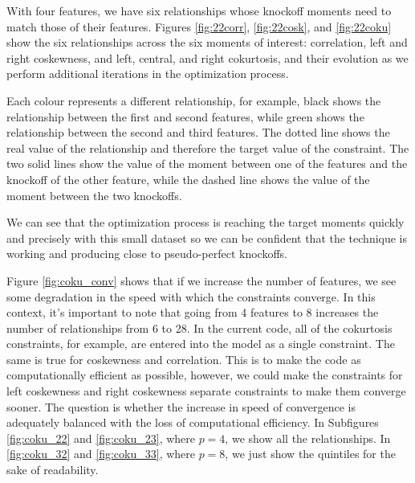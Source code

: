 \documentclass[review]{elsarticle}
\begin{document}
With four features, we have six relationships whose knockoff moments need to match those of their features. Figures \ref{fig:22corr}, \ref{fig:22cosk}, and \ref{fig:22coku} show the six relationships across the six moments of interest: correlation, left and right coskewness, and left, central, and right cokurtosis, and their evolution as we perform additional iterations in the optimization process. 

Each colour represents a different relationship, for example, black shows the relationship between the first and second features, while green shows the relationship between the second and third features. The dotted line shows the real value of the relationship and therefore the target value of the constraint. The two solid lines show the value of the moment between one of the features and the knockoff of the other feature, while the dashed line shows the value of the moment between the two knockoffs.

We can see that the optimization process is reaching the target moments quickly and precisely with this small dataset so we can be confident that the technique is working and producing close to pseudo-perfect knockoffs.

Figure \ref{fig:coku_conv} shows that if we increase the number of features, we see some degradation in the speed with which the constraints converge. In this context, it's important to note that going from 4 features to 8 increases the number of relationships from 6 to 28. In the current code, all of the cokurtosis constraints, for example, are entered into the model as a single constraint. The same is true for coskewness and correlation. This is to make the code as computationally efficient as possible, however, we could make the constraints for left coskewness and right coskewness separate constraints to make them converge sooner. The question is whether the increase in speed of convergence is adequately balanced with the loss of computational efficiency. In Subfigures \ref{fig:coku_22} and \ref{fig:coku_23}, where $p=4$, we show all the relationships. In \ref{fig:coku_32} and \ref{fig:coku_33}, where $p=8$, we just show the quintiles for the sake of readability.
\end{document}
